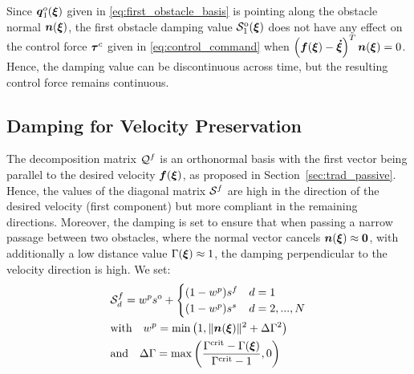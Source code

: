 Since $\boldsymbol{q}_1^o(\boldsymbol{\xi})$ given in \eqref{eq:first_obstacle_basis} is pointing along the obstacle normal $\boldsymbol{n}(\boldsymbol{\xi})$, the first obstacle damping value $\mathcal{S}_1^{\mathrm{o}} (\boldsymbol{\xi})$ does not have any effect on the control force $\boldsymbol{\tau}^c$ given in \eqref{eq:control_command} when $\left(\boldsymbol{f}(\boldsymbol{\xi}) -  \boldsymbol{\dot \xi} \right)^T \boldsymbol{n}(\boldsymbol{\xi}) = 0$.
Hence, the damping value can be discontinuous across time, but the resulting control force remains continuous.


\subsection{Damping for Velocity Preservation}
The decomposition matrix $\mathcal{Q}^{f}$ is an orthonormal basis with the first vector being parallel to the desired velocity $\boldsymbol{f}(\boldsymbol{\xi})$\iflong, as proposed in Section~\ref{sec:trad_passive}\fi. Hence, the values of the diagonal matrix $\mathcal{S}^{f}$ are high in the direction of the desired velocity (first component) but more compliant in the remaining directions. 
Moreover, the damping is set to ensure that when passing a narrow passage between two obstacles, where the normal vector cancels $\boldsymbol{n}(\boldsymbol{\xi}) \approx \boldsymbol{0}$, with additionally a low distance value $\Gamma(\boldsymbol{\xi}) \approx 1$, the damping perpendicular to the velocity direction is high. We set:
\begin{equation}
  \begin{split}
  & \mathcal{S}^{f}_{d} =
  w^p s^{\mathrm{o}} + 
  \begin{cases}
   (1- w^p) s^f & d = 1 \\
   (1- w^p) s^s & d = 2, ..., N 
  \end{cases} \\
  & \text{with} \quad
   w^p = \min \left(1,  \| \boldsymbol{n}(\boldsymbol{\xi}) \|^2 +  \Delta \Gamma ^2 \right) \\
   & \text{and} \quad \Delta \Gamma = \max \left(\frac{\Gamma^{\mathrm{crit}} -\Gamma(\boldsymbol{\xi})}{\Gamma^{\mathrm{crit}} - 1}, 0\right)
  \end{split}
  \label{eq:velocity_damping}
\end{equation}

